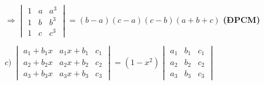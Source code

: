 \documentclass[12pt]{report}
\begin{document}
$\Rightarrow \begin{vmatrix}
	1 & a & a^3 \\
	1 & b & b^3 \\
	1 & c & c^3
\end{vmatrix} = (b-a)(c-a)(c-b)(a+b+c)$ \textbf{(ĐPCM)}

$c)\ \begin{vmatrix}
	a_1+b_1x & a_1x+b_1 & c_1 \\
	a_2+b_2x & a_2x+b_2 & c_2 \\
	a_3+b_3x & a_3x+b_3 & c_3
\end{vmatrix}
= (1-x^2)
\begin{vmatrix}
	a_1 & b_1 & c_1 \\
	a_2 & b_2 & c_2 \\
	a_3 & b_3 & c_3
\end{vmatrix}$
\end{document}

